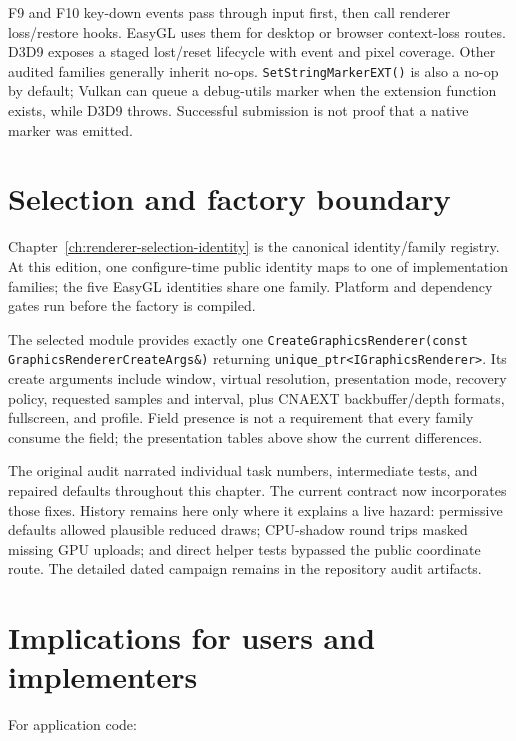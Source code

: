 F9 and F10 key-down events pass through input first, then call renderer loss/restore hooks.
EasyGL uses them for desktop or browser context-loss routes. D3D9 exposes a staged lost/reset
lifecycle with event and pixel coverage. Other audited families generally inherit no-ops.
\texttt{SetStringMarkerEXT()} is also a no-op by default; Vulkan can queue a debug-utils marker
when the extension function exists, while D3D9 throws. Successful submission is not proof that a
native marker was emitted.

\section{Selection and factory boundary}

Chapter~\ref{ch:renderer-selection-identity} is the canonical identity/family registry. At this
edition, one configure-time public identity maps to one of \RendererFamilyCount{} implementation
families; the five EasyGL identities share one family. Platform and dependency gates run before
the factory is compiled.

The selected module provides exactly one
\texttt{CreateGraphicsRenderer(const GraphicsRendererCreateArgs\&)} returning
\texttt{unique\_ptr<IGraphicsRenderer>}. Its create arguments include window, virtual
resolution, presentation mode, recovery policy, requested samples and interval, plus CNAEXT
backbuffer/depth formats, fullscreen, and profile. Field presence is not a requirement that every
family consume the field; the presentation tables above show the current differences.

\begin{historynote}
The original audit narrated individual task numbers, intermediate tests, and repaired defaults
throughout this chapter. The current contract now incorporates those fixes. History remains here
only where it explains a live hazard: permissive defaults allowed plausible reduced draws;
CPU-shadow round trips masked missing GPU uploads; and direct helper tests bypassed the public
coordinate route. The detailed dated campaign remains in the repository audit artifacts.
\end{historynote}

\section{Implications for users and implementers}

For application code:

